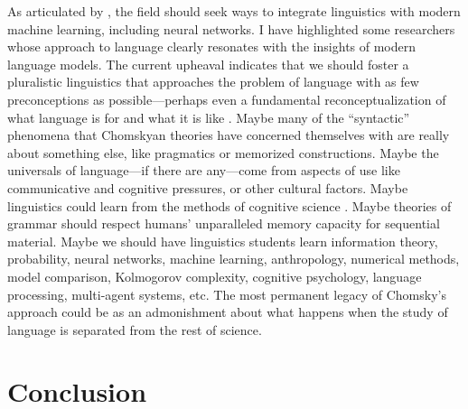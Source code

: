 \documentclass[output=paper,colorlinks,citecolor=brown
]{langscibook}
\begin{document}
As articulated by \cite{pater2019generative}, the field should seek ways to integrate linguistics with modern machine learning, including neural networks. I have highlighted some researchers whose approach to language clearly resonates with the insights of modern language models. The current upheaval indicates that we should foster a pluralistic linguistics that approaches the problem of language with as few preconceptions as possible---perhaps even a fundamental reconceptualization of what language is for and what it is like \citep{edelman2019verbal}. Maybe many of the ``syntactic'' phenomena that Chomskyan theories have concerned themselves with are really about something else, like pragmatics or memorized constructions. Maybe the universals of language---if there are any---come from aspects of use like communicative and cognitive pressures, or other cultural factors. Maybe linguistics could learn from the methods of cognitive science \citep{edelman2007bridging}. Maybe theories of grammar should respect humans' unparalleled memory capacity for sequential material. Maybe we should have linguistics students learn information theory, probability, neural networks, machine learning, anthropology, numerical methods, model comparison, Kolmogorov complexity, cognitive psychology, language processing, multi-agent systems, etc. The most permanent legacy of Chomsky's approach could be as an admonishment about what happens when the study of language is separated from the rest of science. 
\section{Conclusion}
\end{document}
